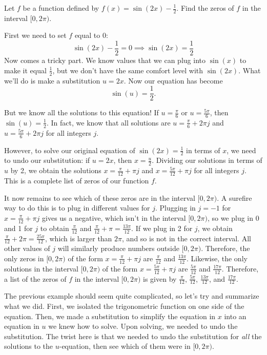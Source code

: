 \documentclass{ximera}
\begin{document}
\begin{example}
Let $f$ be a function defined by $f(x)=\sin(2x) - \frac{1}{2}$. Find the zeros of $f$ in the interval $[0, 2\pi)$.
\begin{explanation}
First we need to set $f$ equal to $0$:
$$\sin(2x) - \frac{1}{2} = 0 \implies \sin(2x) = \frac{1}{2}$$
Now comes a tricky part. We know values that we can plug into $\sin(x)$ to make it equal $\frac{1}{2}$, but we don't have the same comfort level with $\sin(2x)$. What we'll do is make a substitution $u = 2x$. Now our equation has become
$$\sin(u) = \frac{1}{2}.$$

But we know all the solutions to this equation! If $u = \frac{\pi}{6}$ or $u = \frac{5\pi}{6}$, then $\sin(u) = \frac{1}{2}$. In fact, we know that all solutions are $u = \frac{\pi}{6} + 2\pi j$ and $u = \frac{5\pi}{6} + 2\pi j$ for all integers $j$.

However, to solve our original equation of $\sin(2x) = \frac{1}{2}$ in terms of $x$, we need to undo our substitution: if $u = 2x$, then $x = \frac{u}{2}$. Dividing our solutions in terms of $u$ by 2, we obtain the solutions $x = \frac{\pi}{12} + \pi j$ and $x = \frac{5\pi}{12} + \pi j$ for all integers $j$. This is a complete list of zeros of our function $f$.   

It now remains to see which of these zeros are in the interval $[0, 2\pi)$. A surefire way to do this is to plug in different values for $j$. Plugging in $j = -1$ for $x = \frac{\pi}{12} + \pi j$ gives us a negative, which isn't in the interval $[0, 2\pi)$, so we plug in 0 and 1 for $j$ to obtain $\frac{\pi}{12}$ and $\frac{\pi}{12} + \pi = \frac{13\pi}{12}$. If we plug in 2 for $j$, we obtain $\frac{\pi}{12} + 2\pi = \frac{25\pi}{12}$, which is larger than $2\pi$, and so is not in the correct interval. All other values of $j$ will similarly produce numbers outside $[0, 2\pi)$. Therefore, the only zeros in $[0, 2\pi)$ of the form $x = \frac{\pi}{12} + \pi j$ are $\frac{\pi}{12}$ and $\frac{13\pi}{12}$. Likewise, the only solutions in the interval $[0, 2\pi)$ of the form $x = \frac{5\pi}{12} + \pi j$ are $\frac{5\pi}{12}$ and $\frac{17\pi}{12}$. Therefore, a list of the zeros of $f$ in the interval $[0, 2\pi)$ is given by $\frac{\pi}{12}$, $\frac{5\pi}{12}$, $\frac{13\pi}{12}$, and $\frac{17\pi}{12}$. 
\end{explanation}
\end{example}

The previous example should seem quite complicated, so let's try and summarize what we did. First, we isolated the trigonometric function on one side of the equation. Then, we made a substitution to simplify the equation in $x$ into an equation in $u$ we knew how to solve. Upon solving, we needed to undo the substitution. The twist here is that we needed to undo the substitution for \emph{all} the solutions to the $u$-equation, then see which of them were in $[0, 2\pi)$. 
\end{document}
